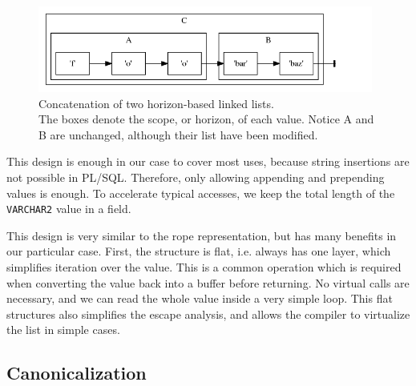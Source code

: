 \documentclass[twoside,11pt,a4paper]{article}
\newcommand{\pls}[1]{\small\texttt{#1}\normalsize}
\newcommand{\plstype}[1]{\pls{#1}}
\newcommand{\varchar}{\plstype{VARCHAR2}}
\begin{document}




\begin{figure}[h]
	\centering
	\includegraphics[width=11cm]{./graphs/hblconcat.png}
	\caption[Concatenation of two horizon-based linked lists]{Concatenation of two horizon-based linked lists.\\ \small The boxes denote the scope, or horizon, of each value. Notice A and B are unchanged, although their list have been modified.}
	\label{fig:hblconcat}
\end{figure}

This design is enough in our case to cover most uses, because string insertions are not possible in PL/SQL. Therefore, only allowing appending and prepending values is enough. To accelerate typical accesses, we keep the total length of the \varchar{} value in a field.

This design is very similar to the rope representation, but has many benefits in our particular case. First, the structure is flat, i.e. always has one layer, which simplifies iteration over the value. This is a common operation which is required when converting the value back into a buffer before returning. No virtual calls are necessary, and we can read the whole value inside a very simple loop. This flat structures also simplifies the escape analysis, and allows the compiler to virtualize the list in simple cases.

\subsection{Canonicalization}

\end{document}
